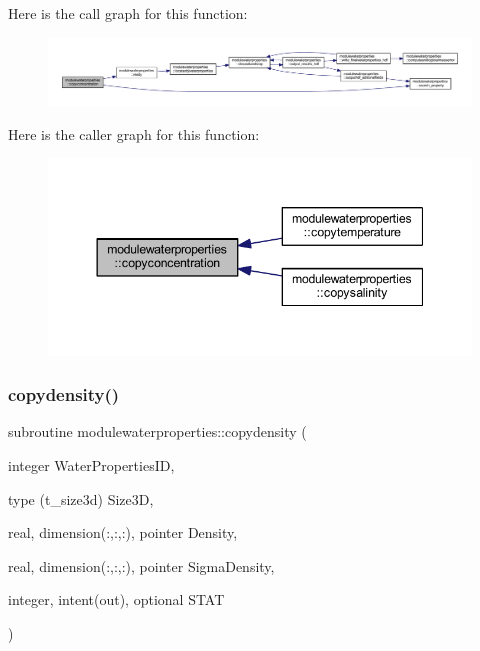 Here is the call graph for this function\+:\nopagebreak
\begin{figure}[H]
\begin{center}
\leavevmode
\includegraphics[width=350pt]{namespacemodulewaterproperties_ab01a5978241b2f90c9951fe60f6f7f8a_cgraph}
\end{center}
\end{figure}
Here is the caller graph for this function\+:\nopagebreak
\begin{figure}[H]
\begin{center}
\leavevmode
\includegraphics[width=344pt]{namespacemodulewaterproperties_ab01a5978241b2f90c9951fe60f6f7f8a_icgraph}
\end{center}
\end{figure}
\mbox{\label{namespacemodulewaterproperties_a71b237b2c78cd159d5fc9be5a1a5f127}} 
\subsubsection{\texorpdfstring{copydensity()}{copydensity()}}
{\footnotesize\ttfamily subroutine modulewaterproperties\+::copydensity (\begin{DoxyParamCaption}\item[{integer}]{Water\+Properties\+ID,  }\item[{type (t\+\_\+size3d)}]{Size3D,  }\item[{real, dimension(\+:,\+:,\+:), pointer}]{Density,  }\item[{real, dimension(\+:,\+:,\+:), pointer}]{Sigma\+Density,  }\item[{integer, intent(out), optional}]{S\+T\+AT }\end{DoxyParamCaption})\hspace{0.3cm}{\ttfamily [private]}}

